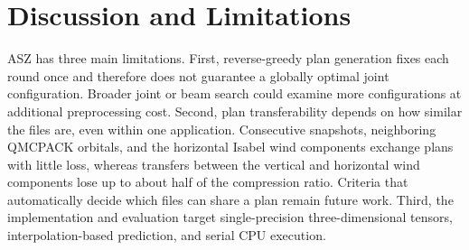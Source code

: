\section{Discussion and Limitations}
\label{sec:discussion}

ASZ has three main limitations. First, reverse-greedy plan generation fixes each round once and therefore does not guarantee a globally optimal joint configuration. Broader joint or beam search could examine more configurations at additional preprocessing cost. Second, plan transferability depends on how similar the files are, even within one application. Consecutive snapshots, neighboring QMCPACK orbitals, and the horizontal Isabel wind components exchange plans with little loss, whereas transfers between the vertical and horizontal wind components lose up to about half of the compression ratio. Criteria that automatically decide which files can share a plan remain future work. Third, the implementation and evaluation target single-precision three-dimensional tensors, interpolation-based prediction, and serial CPU execution.
